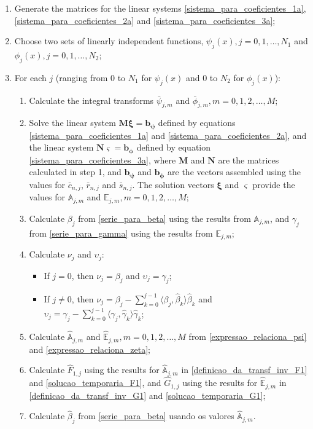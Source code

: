 \documentclass[12pt]{CHT-20}
\begin{document}
\begin{enumerate}
	\item Generate the matrices for the linear systems \eqref{sistema_para_coeficientes_1a},  \eqref{sistema_para_coeficientes_2a} and \eqref{sistema_para_coeficientes_3a};
	\item Choose two sets of linearly independent functions, $\psi_j(x), j=0,1,\ldots,N_1$ and $\phi_j(x), j=0,1,\ldots,N_2$;
	\item For each $j$ (ranging from 0 to $N_1$ for $\psi_j(x)$ and 0 to $N_2$ for $\phi_j(x)$):
	\begin{enumerate}	
		\item Calculate the integral transforms $\bar{\psi}_{j,m}$ and $\bar{\phi}_{j,m}, m=0,1,2, \ldots, M$;
		\item Solve the linear system $\mathbf{M}\mathbf{\xi} = \mathbf{b_\psi}$ defined by equations \eqref{sistema_para_coeficientes_1a} and \eqref{sistema_para_coeficientes_2a}, and the linear system $\mathbf{N}\mathbf{\varsigma} = \mathbf{b_\phi}$ defined by equation \eqref{sistema_para_coeficientes_3a}, where $\mathbf{M}$ and $\mathbf{N}$ are the matrices calculated in step 1, and $\mathbf{b_\psi}$ and $\mathbf{b_\phi}$ are the vectors assembled using the values for $\bar{c}_{n,j}$, $\bar{r}_{n,j}$ and $\bar{s}_{n,j}$. The solution vectors $\mathbf{\xi}$ and $\mathbf{\varsigma}$ provide the values for $\mathbb{A}_{j,m}$ and $\mathbb{E}_{j,m}, m=0,1,2, \ldots, M$;
		\item Calculate $\beta_j$ from \eqref{serie_para_beta} using the results from $\mathbb{A}_{j,m}$, and $\gamma_j$ from \eqref{serie_para_gamma} using the results from $\mathbb{E}_{j,m}$;
		\item Calculate $\nu_j$ and $\upsilon_j$:
		\begin{itemize}
			\item If $j = 0$, then $\nu_j = \beta_j$ and $\upsilon_j = \gamma_j$;
			\item If $j \ne 0$, then $\nu_j = \beta_j - \displaystyle\sum_{k = 0}^{j - 1} \langle \beta_j, \hat{\beta}_k\rangle\hat{\beta}_k$ and $\upsilon_j = \gamma_j - \displaystyle\sum_{k = 0}^{j - 1} \langle \gamma_j, \hat{\gamma}_k\rangle\hat{\gamma}_k$;
		\end{itemize}
		\item Calculate $\hat{\mathbb{A}}_{j,m}$ and $\hat{\mathbb{E}}_{j,m}, m=0,1,2, \ldots, M$ from \eqref{expressao_relaciona_psi} and \eqref{expressao_relaciona_zeta};
		\item Calculate $\hat{F}_{1,j}$ using the results for $\hat{\mathbb{A}}_{j,m}$ in \eqref{definicao_da_transf_inv_F1} and \eqref{solucao_temporaria_F1}, and $\hat{G}_{1,j}$ using the results for $\hat{\mathbb{E}}_{j,m}$ in \eqref{definicao_da_transf_inv_G1} and \eqref{solucao_temporaria_G1};
		\item Calculate $\hat{\beta}_j$ from \eqref{serie_para_beta} usando os valores $\hat{\mathbb{A}}_{j,m}$.
	\end{enumerate}
\end{enumerate}
\end{document}
